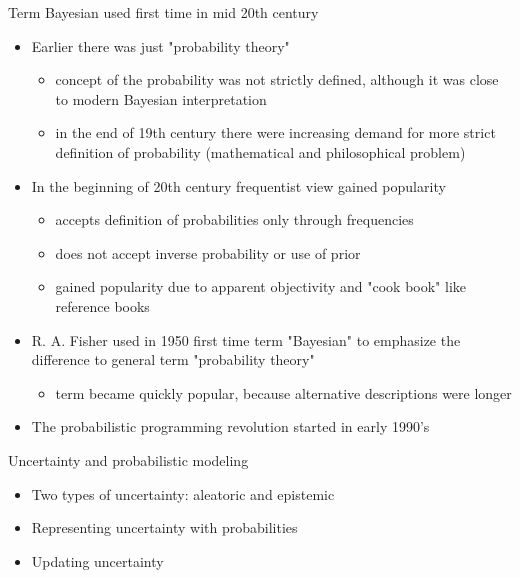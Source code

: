 \documentclass[english,t]{beamer}
\begin{document}
\begin{frame}{Term Bayesian used first time in mid 20th century}

  \begin{itemize}
  \item Earlier there was just "probability theory"
    \begin{itemize}
    \item concept of the probability was not strictly defined,
      although it was close to modern Bayesian interpretation
    \item in the end of 19th century there were increasing demand
      for more strict definition of probability (mathematical and
      philosophical problem)
    \end{itemize}
    \pause
    \item In the beginning of 20th century frequentist view gained popularity
    \begin{itemize}
    \item accepts definition of probabilities only through frequencies
    \item does not accept inverse probability or use of prior
    \item gained popularity due to apparent objectivity and "cook
      book" like reference books
    \end{itemize}
    \pause
    \item R. A. Fisher used in 1950 first
      time term "Bayesian" to emphasize the difference to general
      term "probability theory"
      \begin{itemize}
      \item term became quickly popular, because alternative
        descriptions were longer
    \end{itemize}
    \pause
    \item The probabilistic programming revolution started in early 1990's
\end{itemize}
\end{frame}

\begin{frame}{Uncertainty and probabilistic modeling}

  \begin{itemize}
  \item Two types of uncertainty: aleatoric and epistemic
    \vspace{\baselineskip}
  \item Representing uncertainty with probabilities
    \vspace{\baselineskip}
  \item Updating uncertainty
   \end{itemize}
\end{frame}
\end{document}
